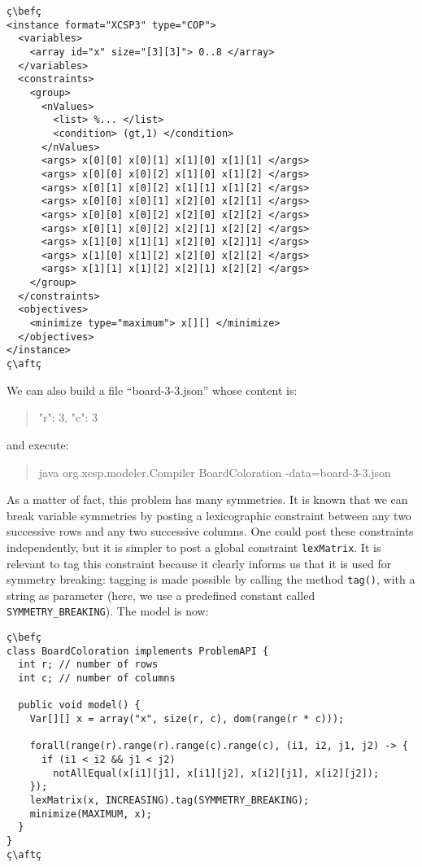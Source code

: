 \documentclass[10pt]{article}
\newcommand{\gb}[1]{{\tt #1}} %
\newcommand{\nn}[1]{{\tt #1}} %
\newenvironment{myvb}{\endgraf\small\verbatim}{\endverbatim}
\def\bef{\rule{10cm}{0.1mm}} %
\def\aft{\rule{10cm}{0.1mm}\medskip}
\begin{document}
\begin{lstlisting}
ç\befç
<instance format="XCSP3" type="COP">
  <variables>
    <array id="x" size="[3][3]"> 0..8 </array>
  </variables>
  <constraints>
    <group>
      <nValues>
        <list> %... </list>
        <condition> (gt,1) </condition>
      </nValues>
      <args> x[0][0] x[0][1] x[1][0] x[1][1] </args>
      <args> x[0][0] x[0][2] x[1][0] x[1][2] </args>
      <args> x[0][1] x[0][2] x[1][1] x[1][2] </args>
      <args> x[0][0] x[0][1] x[2][0] x[2][1] </args>
      <args> x[0][0] x[0][2] x[2][0] x[2][2] </args>
      <args> x[0][1] x[0][2] x[2][1] x[2][2] </args>
      <args> x[1][0] x[1][1] x[2][0] x[2]]1] </args>
      <args> x[1][0] x[1][2] x[2][0] x[2][2] </args>
      <args> x[1][1] x[1][2] x[2][1] x[2][2] </args>
    </group>
  </constraints>
  <objectives>
    <minimize type="maximum"> x[][] </minimize>
  </objectives>
</instance>
ç\aftç
\end{lstlisting}

We can also build a file ``board-3-3.json'' whose content is:
\begin{quote}
\begin{myvb}
{
  "r": 3,
  "c": 3
}
\end{myvb}
\end{quote}
and execute:
\begin{quote}
\begin{myvb}
java org.xcsp.modeler.Compiler BoardColoration -data=board-3-3.json
\end{myvb}
\end{quote}


As a matter of fact, this problem has many symmetries.
It is known that we can break variable symmetries by posting a lexicographic constraint between any two successive rows and any two successive columns.
One could post these constraints independently, but it is simpler to post a global constraint \gb{lexMatrix}.
It is relevant to tag this constraint because it clearly informs us that it is used for symmetry breaking: tagging is made possible by calling the method \nn{tag()}, with a string as parameter (here, we use a predefined constant called \texttt{SYMMETRY\_BREAKING}). 
The model is now:

\begin{lstlisting}
ç\befç
class BoardColoration implements ProblemAPI {
  int r; // number of rows 
  int c; // number of columns

  public void model() {
    Var[][] x = array("x", size(r, c), dom(range(r * c)));
    
    forall(range(r).range(r).range(c).range(c), (i1, i2, j1, j2) -> {
      if (i1 < i2 && j1 < j2)
        notAllEqual(x[i1][j1], x[i1][j2], x[i2][j1], x[i2][j2]);
    });
    lexMatrix(x, INCREASING).tag(SYMMETRY_BREAKING);
    minimize(MAXIMUM, x);
  }
}
ç\aftç
\end{lstlisting}
\end{document}
